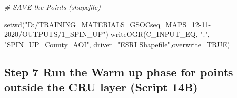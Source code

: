 \documentclass[
  10pt,
  b5paper,
]{book}
\newenvironment{Shaded}{\begin{snugshade}}{\end{snugshade}}
\newcommand{\AttributeTok}[1]{\textcolor[rgb]{0.77,0.63,0.00}{#1}}
\newcommand{\CommentTok}[1]{\textcolor[rgb]{0.56,0.35,0.01}{\textit{#1}}}
\newcommand{\ConstantTok}[1]{\textcolor[rgb]{0.00,0.00,0.00}{#1}}
\newcommand{\FunctionTok}[1]{\textcolor[rgb]{0.00,0.00,0.00}{#1}}
\newcommand{\NormalTok}[1]{#1}
\newcommand{\StringTok}[1]{\textcolor[rgb]{0.31,0.60,0.02}{#1}}
\begin{document}
\begin{Shaded}
\begin{Highlighting}[]
\CommentTok{\# SAVE the Points (shapefile)}

\FunctionTok{setwd}\NormalTok{(}\StringTok{"D:/TRAINING\_MATERIALS\_GSOCseq\_MAPS\_12{-}11{-}2020/OUTPUTS/1\_SPIN\_UP"}\NormalTok{)}
\FunctionTok{writeOGR}\NormalTok{(C\_INPUT\_EQ, }\StringTok{"."}\NormalTok{, }\StringTok{"SPIN\_UP\_County\_AOI"}\NormalTok{, }\AttributeTok{driver=}\StringTok{"ESRI Shapefile"}\NormalTok{,}\AttributeTok{overwrite=}\ConstantTok{TRUE}\NormalTok{) }
\end{Highlighting}
\end{Shaded}

\hypertarget{step-7-run-the-warm-up-phase-for-points-outside-the-cru-layer-script-14b}{%
\subsection*{Step 7 Run the Warm up phase for points outside the CRU layer (Script 14B)}\label{step-7-run-the-warm-up-phase-for-points-outside-the-cru-layer-script-14b}}
\end{document}
